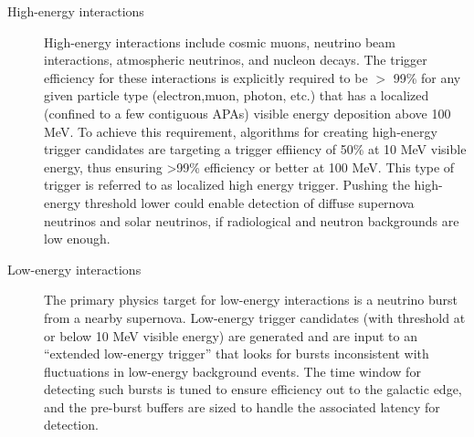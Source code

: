 \begin{description}
\item[High-energy interactions] High-energy interactions include cosmic muons, neutrino beam interactions, atmospheric neutrinos, and nucleon decays. 
  The trigger efficiency for these interactions is explicitly required to be $>$ 99\% for any given particle type (electron,muon, photon, etc.) that has a localized (confined to a few contiguous APAs) visible energy deposition above 100 MeV.
  To achieve this requirement, algorithms for creating high-energy trigger candidates are targeting a trigger effiiency of 50\% at 10 MeV visible energy, thus ensuring >99\% efficiency or better at 100 MeV.
  This type of trigger is referred to as localized high energy trigger. 
  Pushing the high-energy threshold lower could enable detection of diffuse supernova neutrinos and solar neutrinos, if radiological and neutron backgrounds are low enough.

\item[Low-energy interactions] The primary physics target for
  low-energy interactions is a neutrino burst from a nearby supernova. 
  Low-energy trigger candidates (with threshold at or below 10 MeV visible energy) are generated and are input to an ``extended low-energy trigger'' that looks for bursts inconsistent with fluctuations in low-energy background events. 
  The time window for detecting such bursts is tuned to ensure efficiency out to the galactic edge, and the pre-burst buffers are sized to handle the associated latency for detection.

\end{description}



